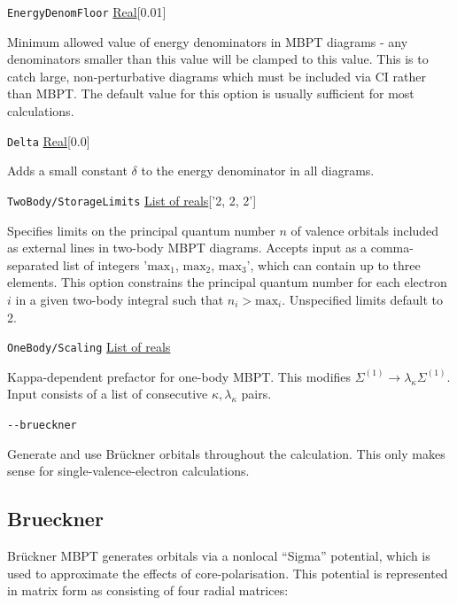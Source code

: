 \documentclass{report}
\begin{document}
\texttt{EnergyDenomFloor} \uline{Real}[0.01]
\begin{adjustwidth}{1cm}{}
Minimum allowed value of energy denominators in MBPT diagrams - any denominators smaller than this value
will be clamped to this value. This is to catch large, non-perturbative diagrams which must be
included via CI rather than MBPT. The default value for this option is usually sufficient for most 
calculations.
\end{adjustwidth}

\texttt{Delta} \uline{Real}[0.0]
\begin{adjustwidth}{1cm}{}
Adds a small constant $\delta$ to the energy denominator in all diagrams.
\end{adjustwidth}

\texttt{TwoBody/StorageLimits} \uline{List of reals}['2, 2, 2']
\begin{adjustwidth}{1cm}{}
Specifies limits on the principal quantum number $n$ of
valence orbitals included as external lines in two-body MBPT diagrams. Accepts input as a 
comma-separated list of integers '$\mathrm{max}_1$, $\mathrm{max}_2$, $\mathrm{max}_3$', which can 
contain up to three elements. This option constrains the principal quantum number for each electron $i$ 
in a given two-body integral such that $n_i > \mathrm{max}_i$. Unspecified limits default to 2.
\end{adjustwidth}

\texttt{OneBody/Scaling} \uline{List of reals}
\begin{adjustwidth}{1cm}{}
Kappa-dependent prefactor for one-body MBPT. This modifies $\Sigma^{(1)} \to \lambda_{\kappa}
\Sigma^{(1)}$. Input consists of a list of consecutive $\kappa, \lambda_{\kappa}$ pairs.
\end{adjustwidth}

\texttt{{-}{-}brueckner}
\begin{adjustwidth}{1cm}{}
Generate and use Br\"{u}ckner orbitals throughout the calculation. This only makes sense for
single-valence-electron calculations.
\end{adjustwidth}

\subsection{Brueckner}

Br\"{u}ckner MBPT generates orbitals via a nonlocal ``Sigma'' potential, which is used to approximate
the effects of core-polarisation. This potential is represented in matrix 
form as consisting of four radial matrices:
\end{document}

